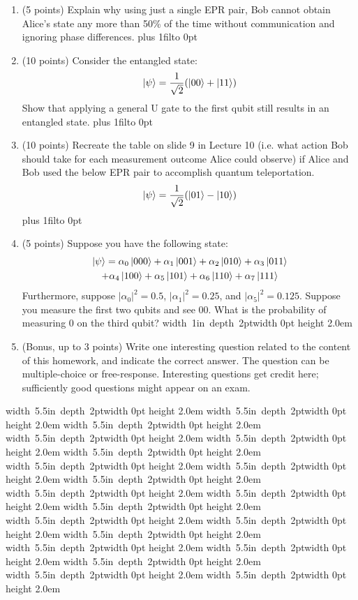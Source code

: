 \documentclass[12pt]{article}
\newcommand{\Blank}{\mbox{\hskip 4pt\vrule width 1in depth 2pt}\vrule width 0pt height 2.0em}
\newcommand{\BlankLine}{\mbox{\hskip 4pt\vrule width 5.5in depth 2pt}\vrule width 0pt height 2.0em}
\def\DefaultSpace{1in}
\newcommand{\LeaveSpace}[1][\DefaultSpace]{%
\vskip #1 plus 1fil\relax\hbox to 0pt{\hss} %
}
\begin{document}
\begin{enumerate}[font=\bfseries]
\begin{enumerate}
    \end{enumerate}
    \item (5 points) Explain why using just a single EPR pair, Bob cannot obtain Alice's state any more than 50\% of the time without communication and ignoring phase differences. \LeaveSpace{}
    \item (10 points) Consider the entangled state: 
    \[\ket{\psi} = \frac{1}{\sqrt{2}}(\ket{00}+\ket{11})\]
    Show that applying a general U gate to the first qubit still results in an entangled state. \LeaveSpace[2.5in]
    \item (10 points) Recreate the table on slide 9 in Lecture 10 (i.e. what action Bob should take for each measurement outcome Alice could observe) if Alice and Bob used the below EPR pair to accomplish quantum teleportation.
    \[\ket{\psi} = \frac{1}{\sqrt{2}}(\ket{01}-\ket{10})\]
    \LeaveSpace[2.25in]
    \item (5 points) Suppose you have the following state:
    \begin{multline} \ket{\psi} = 
        \alpha_0\ket{000} + \alpha_1\ket{001} +
                    \alpha_2\ket{010} + \alpha_3\ket{011}  \\
                    + \alpha_4\ket{100} + \alpha_5\ket{101} +
                    \alpha_6\ket{110} + \alpha_7\ket{111}
    \end{multline}
    Furthermore, suppose $|\alpha_0|^2 = 0.5$, $|\alpha_1|^2 = 0.25$, and $|\alpha_5|^2 = 0.125$. Suppose you measure the first two qubits and see $00$. What is the probability of measuring 0 on the third qubit? \Blank{}
    \newpage
    \item (Bonus, up to 3 points) Write one interesting question related to the content of this homework, and indicate the correct answer. The question can be multiple-choice or free-response.  Interesting questions get credit here;  sufficiently good questions might appear on an exam.
\end{enumerate}
\newpage
\noindent \BlankLine{}
\BlankLine{}
\BlankLine{}
\BlankLine{}
\BlankLine{}
\BlankLine{}
\BlankLine{}
\BlankLine{}
\BlankLine{}
\BlankLine{}
\BlankLine{}
\BlankLine{}
\BlankLine{}
\BlankLine{}
\BlankLine{}
\BlankLine{}
\BlankLine{}
\BlankLine{}
\BlankLine{}
\BlankLine{}
\end{document}
